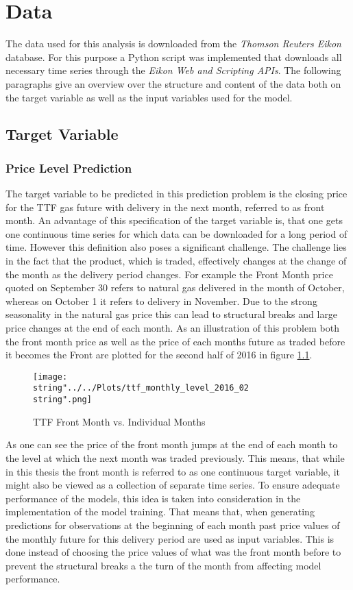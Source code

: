 \chapter{Data}\label{Sec:Data}
The data used for this analysis is downloaded from the \textit{Thomson Reuters Eikon} database. For this purpose  a Python script was implemented that downloads all necessary time series through the \textit{Eikon Web and Scripting APIs}. The following paragraphs give an overview over the structure and content of the data both on the target variable as well as the input variables used for the model. 
\section{Target Variable}
\subsection{Price Level Prediction}
The target variable to be predicted in this prediction problem is the closing price for the TTF gas future with delivery in the next month, referred to as front month. An advantage of this specification of the target variable is, that one gets one continuous time series for which data can be downloaded for a long period of time. However this definition also poses a significant challenge. The challenge lies in the fact that the product, which is traded, effectively changes at the change of the month as the delivery period changes. For example the Front Month price quoted on September 30 refers to natural gas delivered in the month of October, whereas on October 1 it refers to delivery in November. Due to the strong seasonality in the natural gas price this can lead to structural breaks and large price changes at the end of each month. As an illustration of this problem both the front month price as well as the price of each months future as traded before it becomes the Front are plotted for the second half of 2016 in figure \ref{fig:ttf_monthly_level_2016_02}.

\begin{figure}[h!]
  \centering
\texttt{[image: \\string"../../Plots/ttf\_monthly\_level\_2016\_02\\string".png]}
  \caption{TTF Front Month vs. Individual Months}\label{fig:ttf_monthly_level_2016_02}
\end{figure}

As one can see the price of the front month jumps at the end of each month to the level at which the next month was traded previously.  This means, that while in this thesis the front month is referred to as one continuous target variable, it might also be viewed as a collection of separate time series. To ensure adequate performance of the models, this idea is taken into consideration in the implementation of the model training. That means that, when generating predictions for observations at the beginning of each month past price values of the monthly future for this delivery period are used as input variables. This is done instead of choosing the price values of what was the front month before to prevent the structural breaks a the turn of the month from affecting model performance.

